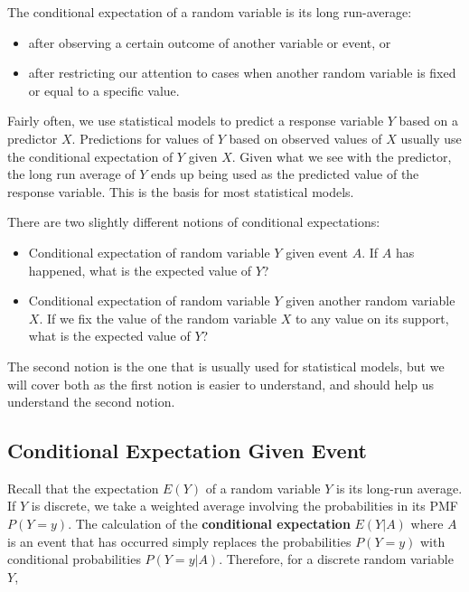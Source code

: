\documentclass[
]{book}
\providecommand{\tightlist}{%
  \setlength{\itemsep}{0pt}\setlength{\parskip}{0pt}}
\begin{document}
The conditional expectation of a random variable is its long run-average:

\begin{itemize}
\tightlist
\item
  after observing a certain outcome of another variable or event, or
\item
  after restricting our attention to cases when another random variable is fixed or equal to a specific value.
\end{itemize}

Fairly often, we use statistical models to predict a response variable \(Y\) based on a predictor \(X\). Predictions for values of \(Y\) based on observed values of \(X\) usually use the conditional expectation of \(Y\) given \(X\). Given what we see with the predictor, the long run average of \(Y\) ends up being used as the predicted value of the response variable. This is the basis for most statistical models.

There are two slightly different notions of conditional expectations:

\begin{itemize}
\tightlist
\item
  Conditional expectation of random variable \(Y\) given event \(A\). If \(A\) has happened, what is the expected value of \(Y\)?
\item
  Conditional expectation of random variable \(Y\) given another random variable \(X\). If we fix the value of the random variable \(X\) to any value on its support, what is the expected value of \(Y\)?
\end{itemize}

The second notion is the one that is usually used for statistical models, but we will cover both as the first notion is easier to understand, and should help us understand the second notion.

\subsection{Conditional Expectation Given Event}\label{conditional-expectation-given-event}

Recall that the expectation \(E(Y)\) of a random variable \(Y\) is its long-run average. If \(Y\) is discrete, we take a weighted average involving the probabilities in its PMF \(P(Y=y)\). The calculation of the \textbf{conditional expectation} \(E(Y|A)\) where \(A\) is an event that has occurred simply replaces the probabilities \(P(Y=y)\) with conditional probabilities \(P(Y=y|A)\). Therefore, for a discrete random variable \(Y\),
\end{document}
